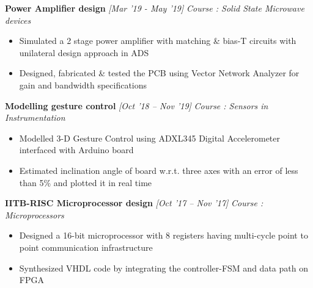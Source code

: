 \documentclass[10 pt]{article}%
\begin{document}
{{{\begin{itemize}[leftmargin=*]
	\end{itemize}
{\flushleft \textbf {\large{Power Amplifier design}} \hfill {{{\em{[Mar '19 - May '19]}}}}
	\vspace{-0.8em}
	{\flushleft \em{Course : Solid State Microwave devices}}
	\vspace{-5pt}
	\begin{itemize}[leftmargin=*]
		\setlength\itemsep{1.5pt}
		\setlength\parskip{1.5pt}
		\item Simulated a 2 stage power amplifier with matching \& bias-T circuits with unilateral design approach in ADS 
		\item Designed, fabricated \& tested the PCB using Vector Network Analyzer for gain and bandwidth specifications
	\end{itemize}
{\flushleft \textbf {\large{Modelling gesture control}} \hfill {{{\em{[Oct '18 – Nov '19]}}}}
	\vspace{-0.8em}
	{\flushleft \em{Course : Sensors in Instrumentation}}
	\vspace{-5pt}
	\begin{itemize}[leftmargin=*]
		\setlength\itemsep{1.5pt}
\setlength\parskip{1.5pt}
		\item Modelled 3-D Gesture Control using ADXL345 Digital Accelerometer interfaced with Arduino board
		\item Estimated inclination angle of board w.r.t. three axes with an error of less than 5\% and plotted it in real time
	\end{itemize}
{\flushleft \textbf {\large{IITB-RISC Microprocessor design}} \hfill {{{\em{[Oct '17 – Nov '17]}}}}
	\vspace{-0.8em}
	{\flushleft \em{Course : Microprocessors}}
	\vspace{-5pt}
	\begin{itemize}[leftmargin=*]
		\setlength\itemsep{1.5pt}
\setlength\parskip{1.5pt}
		\item Designed a 16-bit microprocessor with 8 registers having multi-cycle point to point communication infrastructure
		\item Synthesized VHDL code by integrating the controller-FSM and data path on FPGA

\end{itemize}}}}}}}
\end{document}
